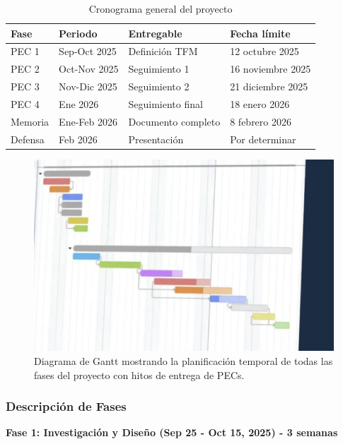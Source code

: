 \documentclass[12pt,a4paper,twoside]{book}
\begin{document}
\begin{table}[h]
\centering
\begin{tabular}{|l|l|l|l|}
\hline
\textbf{Fase} & \textbf{Periodo} & \textbf{Entregable} & \textbf{Fecha límite} \\
\hline
PEC 1 & Sep-Oct 2025 & Definición TFM & 12 octubre 2025 \\
PEC 2 & Oct-Nov 2025 & Seguimiento 1 & 16 noviembre 2025 \\
PEC 3 & Nov-Dic 2025 & Seguimiento 2 & 21 diciembre 2025 \\
PEC 4 & Ene 2026 & Seguimiento final & 18 enero 2026 \\
Memoria & Ene-Feb 2026 & Documento completo & 8 febrero 2026 \\
Defensa & Feb 2026 & Presentación & Por determinar \\
\hline
\end{tabular}
\caption{Cronograma general del proyecto}
\label{tab:cronograma}
\end{table}

\begin{figure}[h]
\centering
\includegraphics[width=\textwidth]{./figs/gantt_diagram.png}
\caption{Diagrama de Gantt mostrando la planificación temporal de todas las fases del proyecto con hitos de entrega de PECs.}
\label{fig:gantt}
\end{figure}

\subsubsection{Descripción de Fases}

\textbf{Fase 1: Investigación y Diseño (Sep 25 - Oct 15, 2025) - 3 semanas}
\end{document}
